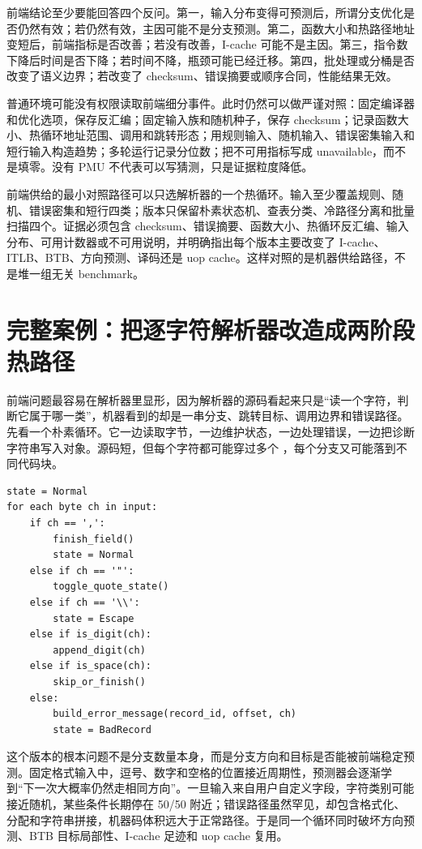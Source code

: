 前端结论至少要能回答四个反问。第一，输入分布变得可预测后，所谓分支优化是否仍然有效；若仍然有效，主因可能不是分支预测。第二，函数大小和热路径地址变短后，前端指标是否改善；若没有改善，I-cache 可能不是主因。第三，指令数下降后时间是否下降；若时间不降，瓶颈可能已经迁移。第四，批处理或分桶是否改变了语义边界；若改变了 checksum、错误摘要或顺序合同，性能结果无效。

普通环境可能没有权限读取前端细分事件。此时仍然可以做严谨对照：固定编译器和优化选项，保存反汇编；固定输入族和随机种子，保存 checksum；记录函数大小、热循环地址范围、调用和跳转形态；用规则输入、随机输入、错误密集输入和短行输入构造趋势；多轮运行记录分位数；把不可用指标写成 unavailable，而不是填零。没有 PMU 不代表可以写猜测，只是证据粒度降低。

前端供给的最小对照路径可以只选解析器的一个热循环。输入至少覆盖规则、随机、错误密集和短行四类；版本只保留朴素状态机、查表分类、冷路径分离和批量扫描四个。证据必须包含 checksum、错误摘要、函数大小、热循环反汇编、输入分布、可用计数器或不可用说明，并明确指出每个版本主要改变了 I-cache、ITLB、BTB、方向预测、译码还是 uop cache。这样对照的是机器供给路径，不是堆一组无关 benchmark。

\section{完整案例：把逐字符解析器改造成两阶段热路径}

前端问题最容易在解析器里显形，因为解析器的源码看起来只是“读一个字符，判断它属于哪一类”，机器看到的却是一串分支、跳转目标、调用边界和错误路径。先看一个朴素循环。它一边读取字节，一边维护状态，一边处理错误，一边把诊断字符串写入对象。源码短，但每个字符都可能穿过多个 ，每个分支又可能落到不同代码块。

\begin{lstlisting}[numbers=none,caption={朴素逐字符解析器的控制流形状}]
state = Normal
for each byte ch in input:
    if ch == ',':
        finish_field()
        state = Normal
    else if ch == '"':
        toggle_quote_state()
    else if ch == '\\':
        state = Escape
    else if is_digit(ch):
        append_digit(ch)
    else if is_space(ch):
        skip_or_finish()
    else:
        build_error_message(record_id, offset, ch)
        state = BadRecord
\end{lstlisting}

这个版本的根本问题不是分支数量本身，而是分支方向和目标是否能被前端稳定预测。固定格式输入中，逗号、数字和空格的位置接近周期性，预测器会逐渐学到“下一次大概率仍然走相同方向”。一旦输入来自用户自定义字段，字符类别可能接近随机，某些条件长期停在 50/50 附近；错误路径虽然罕见，却包含格式化、分配和字符串拼接，机器码体积远大于正常路径。于是同一个循环同时破坏方向预测、BTB 目标局部性、I-cache 足迹和 uop cache 复用。

